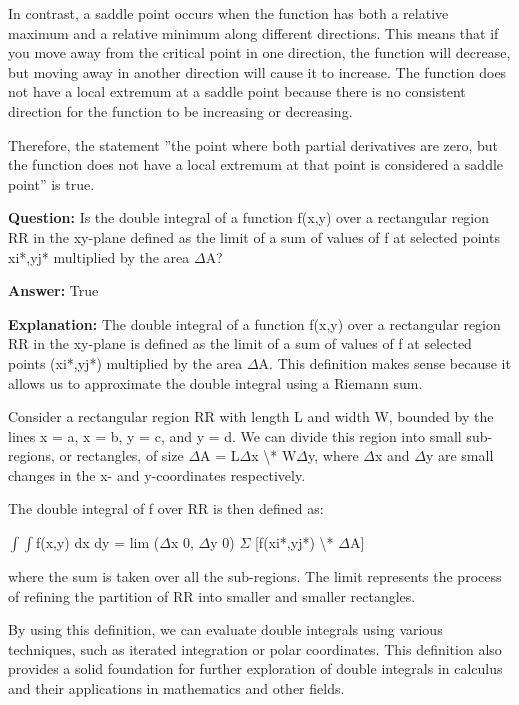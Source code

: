 \documentclass{article}
\begin{document}
In contrast, a saddle point occurs when the function has both a relative maximum and a relative minimum along different directions. This means that if you move away from the critical point in one direction, the function will decrease, but moving away in another direction will cause it to increase. The function does not have a local extremum at a saddle point because there is no consistent direction for the function to be increasing or decreasing.

Therefore, the statement ''the point where both partial derivatives are zero, but the function does not have a local extremum at that point is considered a saddle point'' is true.
                
                \vspace{0.5cm} 
        
            
                \textbf {Question:} Is the double integral of a function f(x,y) over a rectangular region RR in the xy-plane defined as the limit of a sum of values of f at selected points xi*,yj* multiplied by the area \ensuremath{\Delta}A?
                
                \textbf{Answer:} True

                \textbf{Explanation:} The double integral of a function f(x,y) over a rectangular region RR in the xy-plane is defined as the limit of a sum of values of f at selected points (xi*,yj*) multiplied by the area \ensuremath{\Delta}A. This definition makes sense because it allows us to approximate the double integral using a Riemann sum.

Consider a rectangular region RR with length L and width W, bounded by the lines x = a, x = b, y = c, and y = d. We can divide this region into small sub-regions, or rectangles, of size \ensuremath{\Delta}A = L\ensuremath{\Delta}x {\textbackslash}* W\ensuremath{\Delta}y, where \ensuremath{\Delta}x and \ensuremath{\Delta}y are small changes in the x- and y-coordinates respectively.

The double integral of f over RR is then defined as:

\ensuremath{\int}\ensuremath{\int}f(x,y) dx dy = lim (\ensuremath{\Delta}x {\textrightarrow} 0, \ensuremath{\Delta}y {\textrightarrow} 0) \ensuremath{\Sigma} [f(xi*,yj*) {\textbackslash}* \ensuremath{\Delta}A]

where the sum is taken over all the sub-regions. The limit represents the process of refining the partition of RR into smaller and smaller rectangles.

By using this definition, we can evaluate double integrals using various techniques, such as iterated integration or polar coordinates. This definition also provides a solid foundation for further exploration of double integrals in calculus and their applications in mathematics and other fields.
                
\end{document}
